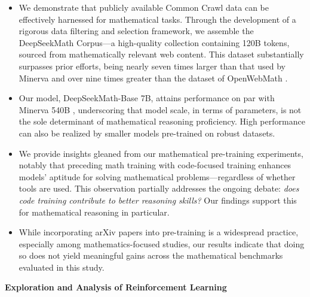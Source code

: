 \begin{itemize}[topsep=0pt]
    \item We demonstrate that publicly available Common Crawl data can be effectively harnessed for mathematical tasks. Through the development of a rigorous data filtering and selection framework, we assemble the DeepSeekMath Corpus—a high-quality collection containing 120B tokens, sourced from mathematically relevant web content. This dataset substantially surpasses prior efforts, being nearly seven times larger than that used by Minerva \citep{minerva} and over nine times greater than the dataset of OpenWebMath \citep{openwebmath}.

    \item Our model, DeepSeekMath-Base 7B, attains performance on par with Minerva 540B \citep{minerva}, underscoring that model scale, in terms of parameters, is not the sole determinant of mathematical reasoning proficiency. High performance can also be realized by smaller models pre-trained on robust datasets.

    \item We provide insights gleaned from our mathematical pre-training experiments, notably that preceding math training with code-focused training enhances models’ aptitude for solving mathematical problems—regardless of whether tools are used. This observation partially addresses the ongoing debate: \textit{does code training contribute to better reasoning skills?} Our findings support this for mathematical reasoning in particular.

    \item While incorporating arXiv papers into pre-training is a widespread practice, especially among mathematics-focused studies, our results indicate that doing so does not yield meaningful gains across the mathematical benchmarks evaluated in this study.
\end{itemize}

\textbf{Exploration and Analysis of Reinforcement Learning}

